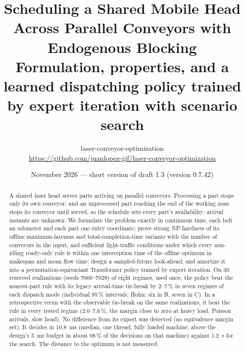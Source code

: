 \documentclass[11pt,a4paper]{article}
\title{\textbf{Scheduling a Shared Mobile Head Across Parallel Conveyors with Endogenous Blocking}\\[0.3em]
\large Formulation, properties, and a learned dispatching policy trained by expert iteration with scenario search}
\author{laser-conveyor-optimization\\\small\url{https://github.com/juanlopez-gif/laser-conveyor-optimization}}
\date{November 2026 --- short version of draft 1.3 (version 0.7.42)}
\theoremstyle{plain}
\theoremstyle{definition}
\theoremstyle{remark}
\begin{document}
\maketitle

\begin{abstract}
A shared laser head serves parts arriving on parallel conveyors. Processing a part stops
only its own conveyor, and an unprocessed part reaching the end of the working zone stops
its conveyor until served, so the schedule sets every part's availability; arrival
instants are unknown. We formulate the problem exactly in continuous time, each belt an
odometer and each part one entry coordinate; prove strong NP-hardness of its offline
maximum-lateness and total-completion-time variants with the number of conveyors in the
input, and sufficient light-traffic conditions under which every non-idling ready-only
rule is within one interception time of the offline optimum in makespan and mean flow
time; design a sampled-future look-ahead; and amortize it into a permutation-equivariant
Transformer policy trained by expert iteration. On 30 reserved realizations (seeds
7000--7029) of eight regimes, used once, the policy beat the nearest-part rule with its
legacy arrival-time tie-break by 2--7\,\% in seven regimes of each dispatch mode
(individual 95\,\% intervals; Holm: six in B, seven in C). In a retrospective rerun with the observable tie-break on the
same realizations, it beat the rule in every tested regime (2.0--7.6\,\%, the margin close
to zero at heavy load, Poisson arrivals, slow head). No difference from its expert was
detected (no equivalence margin set). It decides in 10.8~ms (median, one thread, fully
loaded machine; above the design's 5~ms budget in about 98\,\% of the decisions on that
machine) against 1.2~s for the search. The distance to the optimum is not measured.
\end{abstract}

\end{document}
